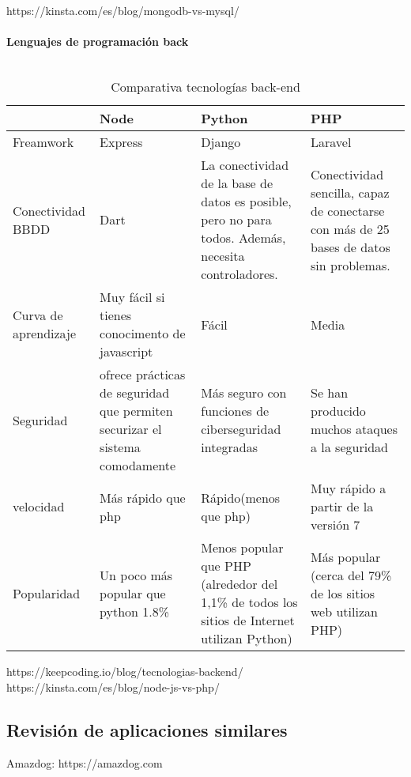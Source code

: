 https://kinsta.com/es/blog/mongodb-vs-mysql/ \\ \\

\textbf{Lenguajes de programación back} \\ \\
\begin{table}[H] %
    \centering
    \begin{tabular}{|p{2cm} |p{4 cm} |p{4cm} |p{4cm} |} \hline 
         &  \textbf{Node}&  \textbf{Python}& \textbf{PHP}\\  \hline 
         Freamwork &  Express &  Django & Laravel\\ \hline 
         
        Conectividad BBDD &  Dart&  La conectividad de la base de datos es posible, pero no para todos. Además, necesita controladores. & Conectividad sencilla, capaz de conectarse con más de 25 bases de datos sin problemas.\\ \hline 
        Curva de aprendizaje &  Muy fácil si tienes conocimento de javascript& Fácil & Media\\ \hline 
        Seguridad &  ofrece prácticas de seguridad que permiten securizar el sistema comodamente&  Más seguro con funciones de ciberseguridad integradas & Se han producido muchos ataques a la seguridad	\\ \hline 
        velocidad &  Más rápido que php &  Rápido(menos que php) & Muy rápido a partir de la versión 7\\ \hline 
        Popularidad & Un poco más popular que python 1.8\% &  Menos popular que PHP (alrededor del 1,1\% de todos los sitios de Internet utilizan Python) & Más popular (cerca del 79\% de los sitios web utilizan PHP)\\ \hline 
    \end{tabular}
    \caption{Comparativa tecnologías back-end}
    \label{tab:tec_back}
\end{table}



https://keepcoding.io/blog/tecnologias-backend/ \\
https://kinsta.com/es/blog/node-js-vs-php/


\subsection{Revisión de aplicaciones similares}

Amazdog: https://amazdog.com